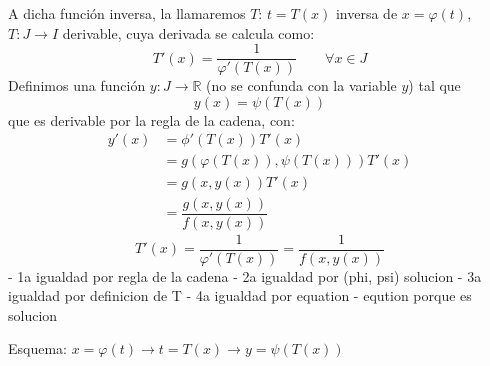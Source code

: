 A dicha función inversa, la llamaremos $T$: $t = T(x)$ inversa de $x=\varphi(t)$, $T:J\rightarrow I$ derivable, cuya derivada se calcula como:
\begin{equation*}
    T'(x) = \dfrac{1}{\varphi'(T(x))} \qquad \forall x\in J
\end{equation*}
Definimos una función $y:J\rightarrow\mathbb{R}$ (no se confunda con la variable $y$) tal que 
\begin{equation*}
    y(x) = \psi(T(x))
\end{equation*}
que es derivable por la regla de la cadena, con:
\begin{align*}
    y'(x) &= \phi'(T(x))T'(x) \\
          &= g(\varphi(T(x)), \psi(T(x)))T'(x) \\
          &= g(x,y(x))T'(x) \\
          &= \dfrac{g(x,y(x))}{f(x,y(x))} 
\end{align*}
\begin{equation*}
    T'(x) = \dfrac{1}{\varphi'(T(x))} = \dfrac{1}{f(x,y(x))}
\end{equation*}
- 1a igualdad por regla de la cadena
- 2a igualdad por (phi, psi) solucion
- 3a igualdad por definicion de T
- 4a igualdad por equation
- eqution porque es solucion

Esquema:
$x = \varphi(t) \rightarrow t=T(x) \rightarrow y=\psi(T(x))$

